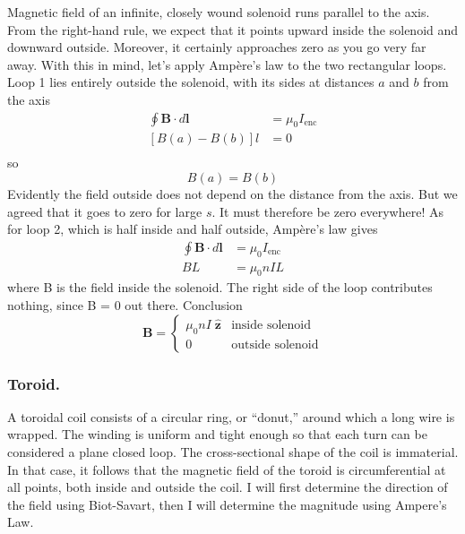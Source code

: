 \documentclass[../../../main.tex]{subfiles}
\begin{document}
Magnetic ﬁeld of an inﬁnite, closely wound solenoid runs parallel to the axis. From the right-hand rule, we expect that it points upward inside the solenoid and downward outside. Moreover, it certainly approaches zero as you go very far away. With this in mind, let’s apply Ampère’s law to the two rectangular loops. Loop 1 lies entirely outside the solenoid, with its sides at distances $a$ 
and $b$ from the axis
\begin{align*}
    \oint \mathbf{B}\cdot d\mathbf{l}&=\mu_0I_{\text{enc}}\\
    [B(a)-B(b)]l&=0\\
\end{align*}
so 
\begin{equation*}
    B(a)=B(b)
\end{equation*}
Evidently the ﬁeld outside does not depend on the distance from the axis. But we agreed that it goes to zero for large $s$. It must therefore be zero everywhere! As for loop 2, which is half inside and half outside, Ampère’s law gives
\begin{align*}
    \oint \mathbf{B}\cdot d\mathbf{l}&=\mu_0I_{\text{enc}}\\
    BL&=\mu_0nIL
\end{align*}
where B is the ﬁeld inside the solenoid. The right side of the loop contributes 
nothing, since B = 0 out there. Conclusion
\begin{equation*}
    \mathbf{B}=\begin{cases}
        \mu_0nI\;\mathbf{\hat{z}}&\text{inside solenoid}\\
        0&\text{outside solenoid}
    \end{cases}
\end{equation*}

\subsubsection{Toroid.} A toroidal coil consists of a circular ring, or “donut,” around which a long wire is wrapped. The winding is uniform and tight enough so that each turn can be considered a plane closed loop. The cross-sectional shape of the coil is immaterial. In that case, it follows that the magnetic ﬁeld of the toroid is circumferential at all points, both inside and outside the coil. I will first determine the direction of the field using Biot-Savart, then I will determine the magnitude using Ampere's Law.

\begin{figure*}
    \centering
\end{figure*}
\end{document}
